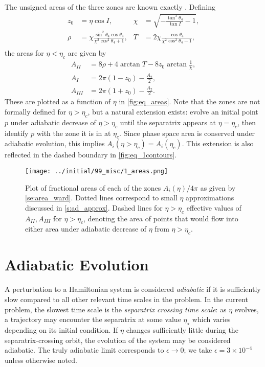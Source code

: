 \documentclass[
        fleqn,
        usenatbib,
        referee,
    ]{mnras}
\newcommand*{\p}[1]{\left(#1\right)}
\begin{document}
The unsigned areas of the three zones are known exactly
\citep{henrard1987,ward2004I}. Defining
\begin{align*}
    z_0 &= \eta\cos I, &
    \chi &= \sqrt{-\frac{\tan^3\theta_4}{\tan I} - 1},\\
    \rho &= \chi \frac{\sin^2 \theta_4\cos \theta_4}{
        \chi^2 \cos^2\theta_4 + 1},&
    T &= 2\chi \frac{\cos \theta_4}{
        \chi^2 \cos^2\theta_4 - 1},\\
\end{align*}
the areas for $\eta < \eta_c$ are given by
\begin{subequations}\label{se:area_ward}
    \begin{align}
        A_{II} &= 8\rho + 4\arctan T - 8z_0 \arctan \frac{1}{\chi},\\
        A_I &= 2\pi\p{1 - z_0} - \frac{A_2}{2},\\
        A_{III} &= 2\pi\p{1 + z_0} - \frac{A_2}{2}.
    \end{align}
\end{subequations}
These are plotted as a function of $\eta$ in \autoref{fig:eq_areas}. Note that
the zones are not formally defined for $\eta > \eta_c$, but a natural extension
exists: evolve an initial point $p$ under adiabatic decrease of $\eta > \eta_c$
until the separatrix appears at $\eta = \eta_c$, then identify $p$ with the zone
it is in at $\eta_c$. Since phase space area is conserved under adiabatic
evolution, this implies $A_i\p{\eta > \eta_c} = A_i(\eta_c)$. This extension is
also reflected in the dashed boundary in \autoref{fig:eq_1contours}.
\begin{figure}
    \centering
    \texttt{[image: ../initial/99\_misc/1\_areas.png]}
    \caption{Plot of fractional areas of each of the zones $A_{i}(\eta) / 4\pi$
    as given by \autoref{se:area_ward}. Dotted lines correspond to small $\eta$
    approximations discussed in \autoref{s:ad_approx}. Dashed lines for $\eta >
    \eta_c$ effective values of $A_{II}, A_{III}$ for $\eta > \eta_c$, denoting
    the area of points that would flow into either area under adiabatic decrease
    of $\eta$ from $\eta > \eta_c$.}\label{fig:eq_areas}
\end{figure}

\section{Adiabatic Evolution}\label{s:ad}

A perturbation to a Hamiltonian system is considered \emph{adiabatic} if it is
sufficiently slow compared to all other relevant time scales in the problem.
In the current problem, the slowest time scale is the \emph{separatrix crossing
time scale}: as $\eta$ evolves, a trajectory may encounter the separatrix at
some value $\eta_\star$ which varies depending on its initial condition. If
$\eta$ changes sufficiently little during the separatrix-crossing orbit, the
evolution of the system may be considered adiabatic. The truly adiabatic limit
corresponds to $\epsilon \to 0$; we take $\epsilon = 3 \times 10^{-4}$ unless
otherwise noted.
\end{document}

